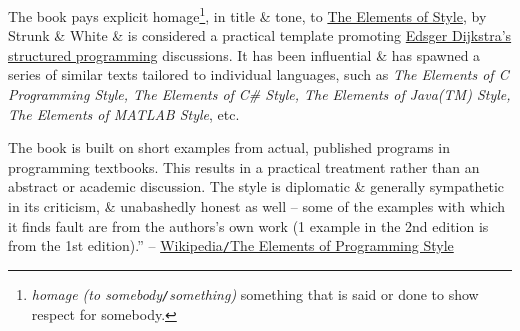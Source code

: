 \documentclass{article}
\begin{document}
The book pays explicit homage\footnote{{\it homage (to somebody{\tt/}something)} something that is said or done to show respect for somebody.}, in title \& tone, to \href{https://en.wikipedia.org/wiki/The_Elements_of_Style}{The Elements of Style}, by Strunk \& White \& is considered a practical template promoting \href{https://en.wikipedia.org/wiki/Edsger_Dijkstra}{Edsger Dijkstra's structured programming} discussions. It has been influential \& has spawned a series of similar texts tailored to individual languages, such as {\it The Elements of C Programming Style, The Elements of C\# Style, The Elements of Java(TM) Style, The Elements of MATLAB Style}, etc.

The book is built on short examples from actual, published programs in programming textbooks. This results in a practical treatment rather than an abstract or academic discussion. The style is diplomatic \& generally sympathetic in its criticism, \& unabashedly honest as well -- some of the examples with which it finds fault are from the authors's own work (1 example in the 2nd edition is from the 1st edition).'' -- \href{https://en.wikipedia.org/wiki/The_Elements_of_Programming_Style}{Wikipedia{\tt/}The Elements of Programming Style}
\end{document}

